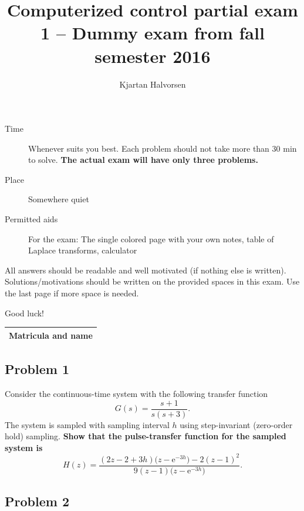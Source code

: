\documentclass[a4paper,12pt]{article}
\title{Computerized control partial exam 1 -- Dummy exam from fall semester 2016}
\author{Kjartan Halvorsen}
\newcommand{\bmpl}{\begin{minipage}[t]{140mm}}
\newcommand{\emp}{\end{minipage}}
\newcommand*{\zethree}{\big(z - \mexp{-3h}\big)}
\newcommand*{\mexp}[1]{\ensuremath{\mathrm{e}^{#1}}}
\begin{document}
\maketitle


\begin{description}
\item[Time] Whenever suits you best. Each problem should not take more than 30 min to solve. \textbf{The actual exam will have only three problems.}
\item[Place] Somewhere quiet
\item[Permitted aids] For the exam: The single colored page with your own notes, table of Laplace transforms, calculator
\end{description}

All answers should be readable and well motivated (if nothing else is written). Solutions/motivations should be written on the provided spaces in this exam. Use the last page if more space is needed.

\begin{center}
{\Large Good luck!} \\
\end{center}

\begin{tabular}{|l|l|}
\hline
\multicolumn{2}{|l|}{\bmpl
Matricula and name
\vspace*{14mm}
\emp}\\
\hline

\end{tabular}

\clearpage

\subsection*{Problem 1}
Consider the continuous-time system with the following transfer function
\[ G(s) = \frac{s+1}{s(s+3)}. \]
The system is sampled with sampling interval $h$ using step-invariant (zero-order hold) sampling. \textbf{Show that the pulse-transfer function for the sampled system is}
\[ H(z) = \frac{(2z-2+3h)\zethree{} - 2(z-1)^2}{9(z-1)\zethree{}}. \]

\noindent
\fbox{
\bmpl
{\bf Derivation:}\\
\vspace*{130mm}
\emp}

\clearpage
\subsection*{Problem 2}
\end{document}
